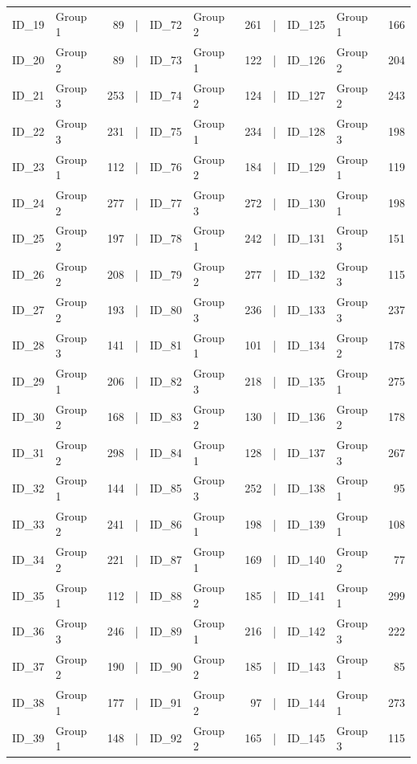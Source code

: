 \documentclass[smallextended]{svjour3}       %
\begin{document}
\begin{table}
\begin{tabular}[t]{llrlllrlllr}
ID\_19 & Group 1 & 89 & | & ID\_72 & Group 2 & 261 & | & ID\_125 & Group 1 & 166\\
ID\_20 & Group 2 & 89 & | & ID\_73 & Group 1 & 122 & | & ID\_126 & Group 2 & 204\\
\addlinespace
ID\_21 & Group 3 & 253 & | & ID\_74 & Group 2 & 124 & | & ID\_127 & Group 2 & 243\\
ID\_22 & Group 3 & 231 & | & ID\_75 & Group 1 & 234 & | & ID\_128 & Group 3 & 198\\
ID\_23 & Group 1 & 112 & | & ID\_76 & Group 2 & 184 & | & ID\_129 & Group 1 & 119\\
ID\_24 & Group 2 & 277 & | & ID\_77 & Group 3 & 272 & | & ID\_130 & Group 1 & 198\\
ID\_25 & Group 2 & 197 & | & ID\_78 & Group 1 & 242 & | & ID\_131 & Group 3 & 151\\
\addlinespace
ID\_26 & Group 2 & 208 & | & ID\_79 & Group 2 & 277 & | & ID\_132 & Group 3 & 115\\
ID\_27 & Group 2 & 193 & | & ID\_80 & Group 3 & 236 & | & ID\_133 & Group 3 & 237\\
ID\_28 & Group 3 & 141 & | & ID\_81 & Group 1 & 101 & | & ID\_134 & Group 2 & 178\\
ID\_29 & Group 1 & 206 & | & ID\_82 & Group 3 & 218 & | & ID\_135 & Group 1 & 275\\
ID\_30 & Group 2 & 168 & | & ID\_83 & Group 2 & 130 & | & ID\_136 & Group 2 & 178\\
\addlinespace
ID\_31 & Group 2 & 298 & | & ID\_84 & Group 1 & 128 & | & ID\_137 & Group 3 & 267\\
ID\_32 & Group 1 & 144 & | & ID\_85 & Group 3 & 252 & | & ID\_138 & Group 1 & 95\\
ID\_33 & Group 2 & 241 & | & ID\_86 & Group 1 & 198 & | & ID\_139 & Group 1 & 108\\
ID\_34 & Group 2 & 221 & | & ID\_87 & Group 1 & 169 & | & ID\_140 & Group 2 & 77\\
ID\_35 & Group 1 & 112 & | & ID\_88 & Group 2 & 185 & | & ID\_141 & Group 1 & 299\\
\addlinespace
ID\_36 & Group 3 & 246 & | & ID\_89 & Group 1 & 216 & | & ID\_142 & Group 3 & 222\\
ID\_37 & Group 2 & 190 & | & ID\_90 & Group 2 & 185 & | & ID\_143 & Group 1 & 85\\
ID\_38 & Group 1 & 177 & | & ID\_91 & Group 2 & 97 & | & ID\_144 & Group 1 & 273\\
ID\_39 & Group 1 & 148 & | & ID\_92 & Group 2 & 165 & | & ID\_145 & Group 3 & 115\\

\end{tabular}
\end{table}
\end{document}
